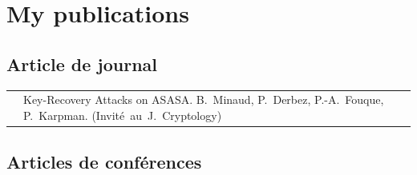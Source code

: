 \newcommand{\mybibtitle}[1]{\textsf{#1.}\hfil}
\newcommand{\mybibauth}[1]{#1.}
\newcommand{\mybibconf}[1]{\hspace*{\stretch{1}}\mbox{(#1)}}

\setcounter{section}{0}
\renewcommand\thesection{\Alph{section}}
\section[Mes publications]{My publications}

\subsection{Article de journal}

\noindent
\begin{tabularx}{\linewidth}{zX}
  \cite{asasajour} &
  \mybibtitle{Key-Recovery Attacks on ASASA}
  \mybibauth{B.~Minaud, P.~Derbez, P.-A.~Fouque, P.~Karpman}
  \mybibconf{Invité au J. Cryptology} \\
\end{tabularx}

\subsection{Articles de conférences}

